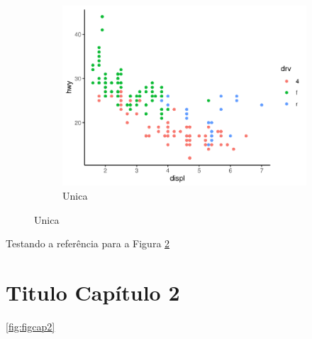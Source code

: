 \lipsum[1-5]

\begin{figure}
\begin{subfigure}{\linewidth}
		\caption{Unica}\label{fig:single}
		\includegraphics{fig/plot}
\end{subfigure}
\end{figure}

\par Testando a referência para a Figura \ref{fig:single}

\chapter{Titulo Capítulo 2}
	
\lipsum[1-6]

\par \ref{fig:figcap2}

